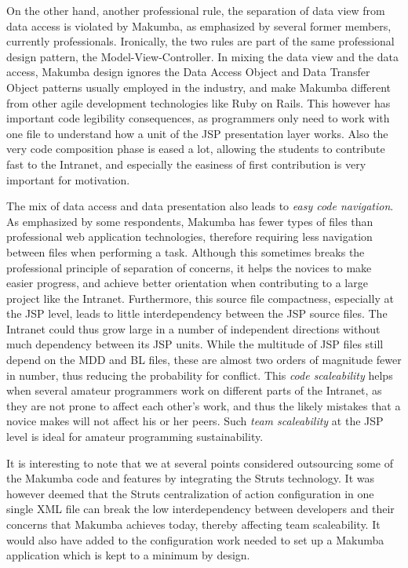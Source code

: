 \documentclass{llncs}
\begin{document}
On the other hand, another professional rule, the separation of data view from data access is violated by Makumba, as emphasized by several former members, currently professionals. Ironically, the two rules are part of the same professional design pattern, the Model-View-Controller. In mixing the data view and the data access, Makumba design ignores the Data Access Object and Data Transfer Object patterns usually employed in the industry, and make Makumba different from other agile development technologies like Ruby on Rails. This however has important code legibility consequences, as programmers only need to work with one file to understand how a unit of the JSP presentation layer works. Also the very code composition phase is eased a lot, allowing the students to contribute fast to the Intranet, and especially the easiness of first contribution is very important for motivation. 

The mix of data access and data presentation also leads to \textit{easy code navigation}.  As emphasized by some respondents, Makumba has fewer types of files than professional web application technologies, therefore requiring less navigation between files when performing a task. Although this sometimes breaks the professional principle of separation of concerns, it helps the novices to make easier progress, and achieve better orientation when contributing to a large project like the Intranet. Furthermore, this source file compactness, especially at the JSP level, leads to little interdependency between the JSP source files. The Intranet could thus grow large in a number of independent directions without much dependency between its JSP units. While the multitude of JSP files still depend on the MDD and BL files, these are almost two orders of magnitude fewer in number, thus reducing the probability for conflict. This \textit{code scaleability}  helps when several amateur programmers work on different parts of the Intranet, as they are not prone to affect each other's work, and thus the likely mistakes that a novice makes will not affect his or her peers. Such \textit{team scaleability} at the JSP level is ideal for amateur programming sustainability.

It is interesting to note that we at several points considered outsourcing some of the Makumba code and features by integrating the Struts technology. It was however deemed that the Struts centralization of action configuration in one single XML file can break the low interdependency between developers and their concerns that Makumba achieves today, thereby affecting team scaleability. It would also have added to the configuration work needed to set up a Makumba application which is kept to a minimum by design.
\end{document}
